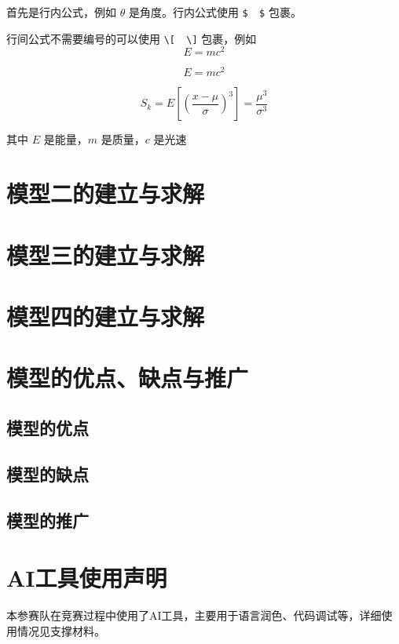 \documentclass[withoutpreface,bwprint]{cumcmthesis} %
\begin{document}
首先是行内公式，例如 $ \theta $ 是角度。行内公式使用 \verb|$  $| 包裹。

行间公式不需要编号的可以使用 \verb|\[  \]| 包裹，例如
\[
E=mc^2
\]

\[
E=mc^2 \tag{1}
\]

\begin{equation}
S_k = E \left[ \left( \frac{x - \mu}{\sigma} \right)^3 \right] = \frac{\mu^3}{\sigma^3}
\label{eq:energy}
\end{equation}

其中 $ E $ 是能量，$ m $ 是质量，$ c $ 是光速

\section{模型二的建立与求解}

\section{模型三的建立与求解}

\section{模型四的建立与求解}

\section{模型的优点、缺点与推广}
\subsection{模型的优点}
\subsection{模型的缺点}
\subsection{模型的推广}

\section{AI工具使用声明}
本参赛队在竞赛过程中使用了AI工具，主要用于语言润色、代码调试等，详细使用情况见支撑材料。
\end{document}
